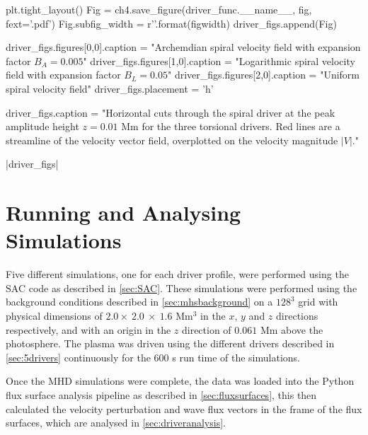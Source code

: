 \begin{pycode}[chapter4]
    plt.tight_layout()
    Fig = ch4.save_figure(driver_func.__name__, fig, fext='.pdf')
    Fig.subfig_width = r'{}\columnwidth'.format(figwidth)
    driver_figs.append(Fig)

driver_figs.figures[0,0].caption = "Archemdian spiral velocity field with expansion factor $B_A=0.005$"
driver_figs.figures[1,0].caption = "Logarithmic spiral velocity field with expansion factor $B_L=0.05$"
driver_figs.figures[2,0].caption = "Uniform spiral velocity field"
driver_figs.placement = 'h'

driver_figs.caption = "Horizontal cuts through the spiral driver at the peak amplitude height $z = 0.01$ Mm for the three torsional drivers. Red lines are a streamline of the velocity vector field, overplotted on the velocity magnitude $|V|$."
\end{pycode}

\py[chapter4]|driver_figs|

\section{Running and Analysing Simulations}

Five different simulations, one for each driver profile, were performed using the SAC code as described in \cref{sec:SAC}.
These simulations were performed using the background conditions described in \cref{sec:mhsbackground} on a $128^3$ grid with physical dimensions of $2.0 \times\ 2.0\ \times\ 1.6$ Mm$^3$ in the $x$, $y$ and $z$ directions respectively, and with an origin in the $z$ direction of $0.061$ Mm above the photosphere.
The plasma was driven using the different drivers described in \cref{sec:5drivers} continuously for the $600$ s run time of the simulations.

Once the MHD simulations were complete, the data was loaded into the Python flux surface analysis pipeline as described in \cref{sec:fluxsurfaces}, this then calculated the velocity perturbation and wave flux vectors in the frame of the flux surfaces, which are analysed in \cref{sec:driveranalysis}.


